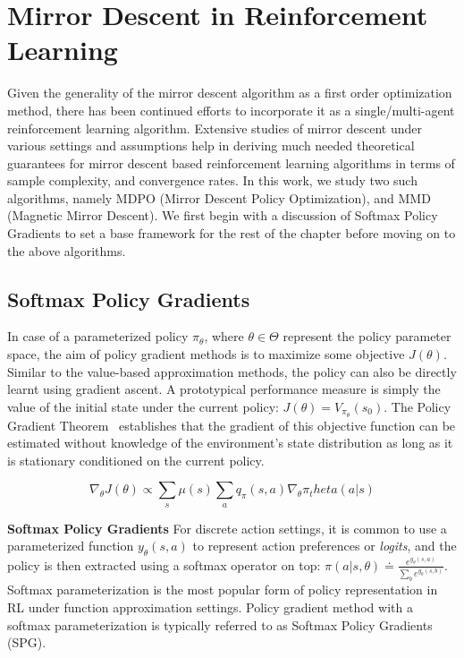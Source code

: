 \chapter{Mirror Descent in Reinforcement Learning}

Given the generality of the mirror descent algorithm as a first order optimization method, there
has been continued efforts to incorporate it as a single/multi-agent reinforcement learning
algorithm.
Extensive studies of mirror descent under various settings and assumptions help in deriving much
needed theoretical guarantees for mirror descent based reinforcement learning algorithms in terms
of sample complexity, and convergence rates.
In this work, we study two such algorithms, namely MDPO (Mirror Descent Policy Optimization), and
MMD (Magnetic Mirror Descent).
We first begin with a discussion of Softmax Policy Gradients to set a base framework for the rest
of the chapter before moving on to the above algorithms.

\section[SPG]{Softmax Policy Gradients}
\label{sec:spg}
In case of a parameterized policy $\pi_\theta$, where $\theta \in \Theta$ represent the policy
parameter space, the aim of policy gradient methods is to maximize some objective $J(\theta)$.
Similar to the value-based approximation methods, the policy can also be directly learnt using
gradient ascent.
A prototypical performance measure is simply the value of the initial state under the current
policy: $J(\theta) = V_{\pi_\theta}(s_0)$.
The Policy Gradient Theorem~\cite[Chapter 13.2]{suttonReinforcement2018} establishes that the
gradient of this objective function can be estimated without knowledge of the environment's state
distribution as long as it is stationary conditioned on the current policy.

$$ \nabla_\theta J(\theta) \propto \sum_s \mu(s) \sum_a q_\pi(s,a) \nabla_\theta \pi_theta(a|s) $$

\textbf{Softmax Policy Gradients}
For discrete action settings, it is common to use a parameterized function $y_\theta(s, a)$ to
represent action preferences or \textit{logits}, and the policy is then extracted using a softmax
operator on top: $\pi(a|s, \theta) \doteq \frac{e^{y_\theta(s, a)}}{\sum_b e^{y_\theta(s,b)}}$.
Softmax parameterization is the most popular form of policy representation in RL under function
approximation settings.
Policy gradient method with a softmax parameterization is typically referred to as Softmax Policy
Gradients (SPG).

